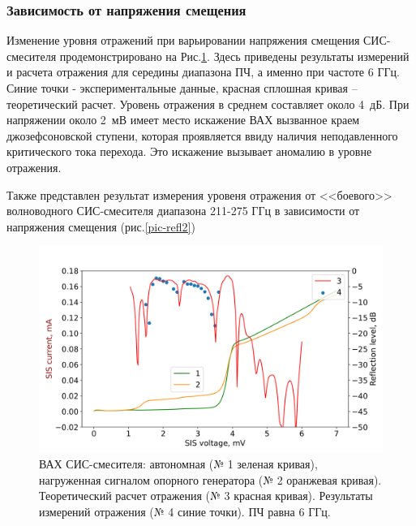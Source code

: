 \documentclass[a4paper]{article}
\begin{document}
\subsubsection{Зависимость от напряжения смещения}

Изменение уровня отражений при варьировании напряжения смещения СИС-смесителя продемонстрировано на Рис.\ref{pic-refl}. Здесь приведены результаты измерений и расчета отражения для середины диапазона ПЧ, а именно при частоте 6 ГГц. Синие точки - экспериментальные данные, красная сплошная кривая – теоретический расчет. Уровень отражения в среднем составляет около 4 дБ. При напряжении около 2 мВ имеет место искажение ВАХ вызванное краем джозефсоновской ступени, которая проявляется ввиду наличия неподавленного критического тока перехода. Это искажение вызывает аномалию в уровне отражения. \par

Также представлен результат измерения уровеня отражения от <<боевого>> волноводного СИС-смесителя  диапазона 211-275 ГГц в зависимости от напряжения смещения (рис.\ref{pic-refl2})

\begin{figure}[H]
    \centering
    \includegraphics[scale=0.6]{refl.png}
    \caption{ВАХ СИС-смесителя: автономная (№ 1 зеленая кривая), нагруженная сигналом опорного генератора (№ 2 оранжевая кривая). Теоретический расчет отражения (№ 3 красная кривая). Результаты измерений отражения (№ 4 синие точки). ПЧ равна 6 ГГц.}
    \label{pic-refl}
\end{figure}
\end{document}
